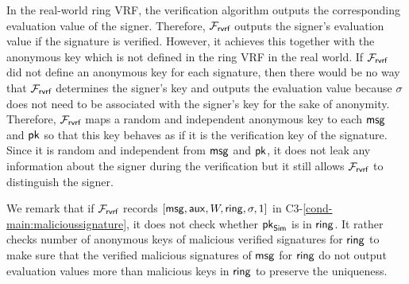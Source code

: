 \begin{tcolorbox}[left=2pt,right=2pt]
	\end{tcolorbox}
	
	In the real-world ring VRF, the verification algorithm outputs the corresponding evaluation value of the signer. Therefore, $ \mathcal{F}_{\textsf{rvrf}} $  outputs the signer's evaluation value if the signature is verified. However, it achieves this together with the anonymous key which is not defined in the ring VRF in the real world.  If $ \mathcal{F}_{\textsf{rvrf}} $ did not define an anonymous key for  each signature, then there would be no way that $ \mathcal{F}_{\textsf{rvrf}} $ determines the signer's key and outputs the evaluation value because $ \sigma $ does not need to be associated with the signer's key for the sake of anonymity. Therefore, $ \mathcal{F}_{\textsf{rvrf}} $ maps a random and independent anonymous key to each $ \mathsf{msg} $ and $ \mathsf{pk} $ so that this key behaves as if it is the verification key of the signature. Since it  is  random and independent from $ \mathsf{msg} $ and $ \mathsf{pk} $, it does not leak any information about the signer during the verification but it still allows $ \mathcal{F}_{\textsf{rvrf}} $ to distinguish the signer.
	
	We remark that if $ \mathcal{F}_{\textsf{rvrf}} $ records $ [\mathsf{msg}, \mathsf{aux}, W, \mathsf{ring}, \sigma, 1] $ in C3-\ref{cond-main:malicioussignature}, it does not check whether $ \mathsf{pk}_{\mathsf{Sim}} $ is in $ \mathsf{ring} $.  It rather checks number of anonymous keys of malicious verified signatures for $ \mathsf{ring} $ to make sure that the verified malicious signatures of $ \mathsf{msg} $ for $ \mathsf{ring} $ do not output evaluation values more than malicious keys in $ \mathsf{ring} $ to preserve the uniqueness.
	
	
	
